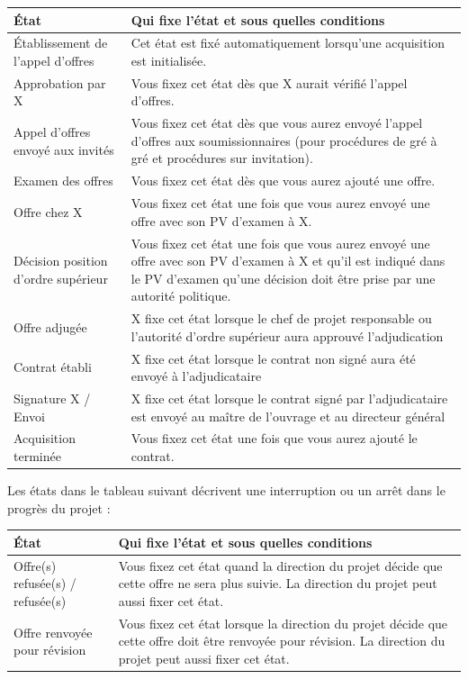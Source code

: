 \begin{tabular}{|p{5cm}|p{9.5cm}|}    %
\hline
\textbf{État} & \textbf{Qui fixe l'état et sous quelles conditions} \\
\hline
Établissement de l'appel d'offres & Cet état est fixé automatiquement lorsqu'une acquisition est initialisée. \\
\hline
Approbation par X & Vous fixez cet état dès que X aurait vérifié l'appel d'offres. \\
\hline
Appel d'offres envoyé aux invités & Vous fixez cet état dès que vous aurez envoyé l'appel d'offres aux soumissionnaires (pour procédures de gré à gré 
et procédures sur invitation). \\
\hline
Examen des offres & Vous fixez cet état dès que vous aurez ajouté une offre. \\
\hline
Offre chez X & Vous fixez cet état une fois que vous aurez envoyé une offre avec son PV d'examen à X. \\
\hline
Décision position d'ordre supérieur & Vous fixez cet état une fois que vous aurez envoyé une offre avec son PV d'examen à X et qu'il est indiqué dans le PV d'examen qu'une décision doit être prise par une autorité politique. \\
\hline
Offre adjugée & X fixe cet état lorsque le chef de projet responsable ou l'autorité d'ordre supérieur aura approuvé l'adjudication \\
\hline
Contrat établi & X fixe cet état lorsque le contrat non signé aura été envoyé à l'adjudicataire \\
\hline
Signature X / Envoi & X fixe cet état lorsque le contrat signé par l'adjudicataire est envoyé au maître de l'ouvrage et au directeur général \\
\hline
Acquisition terminée & Vous fixez cet état une fois que vous aurez ajouté le contrat. \\
\hline
\end{tabular}

\vspace{\baselineskip}

Les états dans le tableau suivant décrivent une interruption ou un arrêt dans le progrès du projet :

\vspace{\baselineskip}

\begin{tabular}{|p{5cm}|p{9.5cm}|}    %
\hline
\textbf{État} & \textbf{Qui fixe l'état et sous quelles conditions} \\
\hline
Offre(s) refusée(s) / refusée(s) & Vous fixez cet état quand la direction du projet décide que cette offre ne sera plus suivie. La direction du projet peut aussi fixer cet état. \\
\hline
Offre renvoyée pour révision & Vous fixez cet état lorsque la direction du projet décide que cette offre doit être renvoyée pour révision. La direction du projet peut aussi fixer cet état. \\
\hline
\end{tabular}

